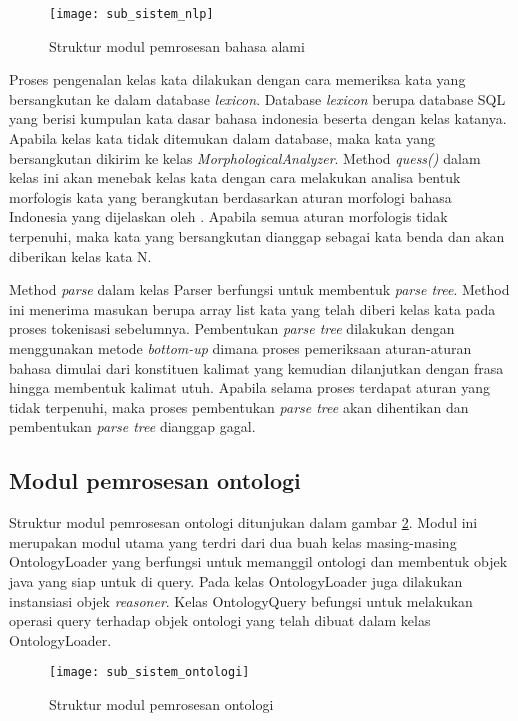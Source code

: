 \begin{figure}[ht]
    \centering
    \texttt{[image: sub\_sistem\_nlp]}
    \caption{Struktur modul pemrosesan bahasa alami} 
    \label{fig:sub_sistem_nlp}
\end{figure}

Proses pengenalan kelas kata dilakukan dengan cara memeriksa kata yang bersangkutan ke dalam database \emph{lexicon}. Database \emph{lexicon} berupa database SQL yang berisi kumpulan kata dasar bahasa indonesia beserta dengan kelas katanya. Apabila kelas kata tidak ditemukan dalam database, maka kata yang bersangkutan dikirim ke kelas \emph{MorphologicalAnalyzer}. Method \emph{quess()} dalam kelas ini akan menebak kelas kata dengan cara melakukan analisa bentuk morfologis kata yang berangkutan berdasarkan aturan morfologi bahasa Indonesia yang dijelaskan oleh \citet{alwi}. Apabila semua aturan morfologis tidak terpenuhi, maka kata yang bersangkutan dianggap sebagai kata benda dan akan diberikan kelas kata N.

Method \emph{parse} dalam kelas Parser berfungsi untuk membentuk \emph{parse tree}. Method ini menerima masukan berupa array list kata yang telah diberi kelas kata pada proses tokenisasi sebelumnya. Pembentukan \emph{parse tree} dilakukan dengan menggunakan metode \emph{bottom-up} dimana proses pemeriksaan aturan-aturan bahasa dimulai dari konstituen kalimat yang kemudian dilanjutkan dengan frasa hingga membentuk kalimat utuh. Apabila selama proses terdapat aturan yang tidak terpenuhi, maka proses pembentukan \emph{parse tree} akan dihentikan dan pembentukan \emph{parse tree} dianggap gagal.

\subsection{Modul pemrosesan ontologi}
Struktur modul pemrosesan ontologi ditunjukan dalam gambar \ref{fig:sub_sistem_ontologi}. Modul ini merupakan modul utama yang terdri dari dua buah kelas masing-masing OntologyLoader yang berfungsi untuk memanggil ontologi dan membentuk objek java yang siap untuk di query. Pada kelas OntologyLoader juga dilakukan instansiasi objek \emph{reasoner}. Kelas OntologyQuery befungsi untuk melakukan operasi query terhadap objek ontologi yang telah dibuat dalam kelas OntologyLoader.

\begin{figure}[ht]
    \centering
    \texttt{[image: sub\_sistem\_ontologi]}
    \caption{Struktur modul pemrosesan ontologi} 
    \label{fig:sub_sistem_ontologi}
\end{figure}

